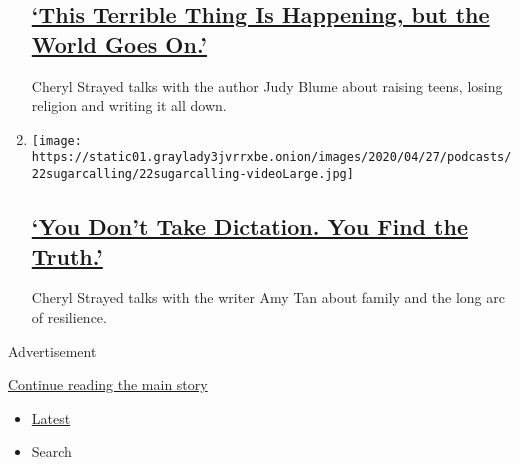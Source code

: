 \begin{enumerate}
  \hypertarget{this-terrible-thing-is-happening-but-the-world-goes-on}{%
  \subsection{\texorpdfstring{\href{/2020/04/29/podcasts/sugar-calling-judy-blume-quarantine-virus.html}{`This
  Terrible Thing Is Happening, but the World Goes
  On.'}}{`This Terrible Thing Is Happening, but the World Goes On.'}}\label{this-terrible-thing-is-happening-but-the-world-goes-on}}

  Cheryl Strayed talks with the author Judy Blume about raising teens,
  losing religion and writing it all down.
\item
  \texttt{[image: https://static01.graylady3jvrrxbe.onion/images/2020/04/27/podcasts/22sugarcalling/22sugarcalling-videoLarge.jpg]}

  \hypertarget{you-dont-take-dictation-you-find-the-truth}{%
  \subsection{\texorpdfstring{\href{/2020/04/22/podcasts/sugar-calling-amy-tan-quarantine-virus.html}{`You
  Don't Take Dictation. You Find the
  Truth.'}}{`You Don't Take Dictation. You Find the Truth.'}}\label{you-dont-take-dictation-you-find-the-truth}}

  Cheryl Strayed talks with the writer Amy Tan about family and the long
  arc of resilience.
\end{enumerate}

Advertisement

\protect\hyperlink{after-mid4}{Continue reading the main story}

\begin{itemize}
\tightlist
\item
  \protect\hyperlink{stream-panel}{Latest}
\item
  Search
\end{itemize}

